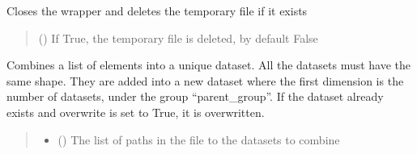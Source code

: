 \documentclass[letterpaper,10pt,english]{sphinxmanual}
\begin{document}
\begin{fulllineitems}
\begin{fulllineitems}
\begin{quote}
\begin{description}
\end{description}\end{quote}

\end{fulllineitems}


\begin{fulllineitems}
\label{\detokenize{_autosummary/HDF5_BLS.wrapper:HDF5_BLS.wrapper.Wrapper.close}}
\pysigstartsignatures
\pysiglinewithargsret
{}
{}
{}
\pysigstopsignatures
\sphinxAtStartPar
Closes the wrapper and deletes the temporary file if it exists
\begin{quote}\begin{description}
\sphinxAtStartPar
{} (\sphinxstyleliteralemphasis{\sphinxupquote{, }}) \textendash{} If True, the temporary file is deleted, by default False

\end{description}\end{quote}

\end{fulllineitems}


\begin{fulllineitems}
\label{\detokenize{_autosummary/HDF5_BLS.wrapper:HDF5_BLS.wrapper.Wrapper.combine_datasets}}
\pysigstartsignatures
\pysiglinewithargsret
{}
{\sphinxparamcomma {}\sphinxparamcomma {}\sphinxparamcomma {}}
{}
\pysigstopsignatures
\sphinxAtStartPar
Combines a list of elements into a unique dataset. All the datasets must have the same shape. They are added into a new dataset where the first dimension is the number of datasets, under the group “parent\_group”. If the dataset already exists and overwrite is set to True, it is overwritten.
\begin{quote}\begin{description}
\begin{itemize}
\item {} 
\sphinxAtStartPar
{} () \textendash{} The list of paths in the file to the datasets to combine


\end{itemize}
\end{description}
\end{quote}
\end{fulllineitems}
\end{fulllineitems}
\end{document}
